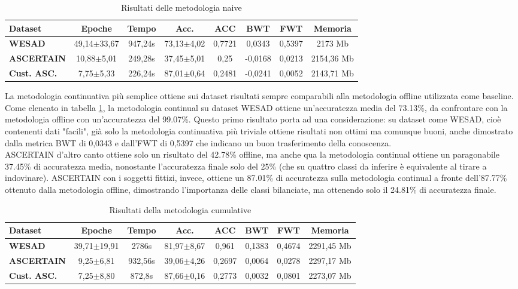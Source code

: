 \begin{table}[h]
\footnotesize
    \begin{tabular}{l|c|c|c|c|c|c|c}
        \textbf{Dataset} & \textbf{Epoche} & \textbf{Tempo} & \textbf{Acc.} & \textbf{ACC} & \textbf{BWT} & \textbf{FWT} & \textbf{Memoria}\\
        \hline
        \textbf{WESAD} & 49,14$\pm$33,67 & 947,24s & 73,13$\pm$4,02 & 0,7721 & 0,0343 & 0,5397 & 2173 Mb\\
        \textbf{ASCERTAIN} & 10,88$\pm$5,01 & 249,28s & 37,45$\pm$5,01 & 0,25 & -0,0168 & 0,0213 & 2154,36 Mb\\
        \textbf{Cust. ASC.} & 7,75$\pm$5,33 & 226,24s & 87,01$\pm$0,64 & 0,2481 & -0,0241 & 0,0052 & 2143,71 Mb\\
    \end{tabular}
    \caption{Risultati delle metodologia naive}
    \label{tab:rescontinual}
\end{table}

La metodologia continuativa più semplice ottiene sui dataset risultati sempre comparabili alla metodologia offline utilizzata come baseline. Come elencato in tabella \ref{tab:rescontinual}, la metodologia continual su dataset WESAD ottiene un'accuratezza media del 73.13\%, da confrontare con la metodologia offline con un'accuratezza del 99.07\%. Questo primo risultato porta ad una considerazione: su dataset come WESAD, cioè contenenti dati "facili", già solo la metodologia continuativa più triviale ottiene risultati non ottimi ma comunque buoni, anche dimostrato dalla metrica BWT di 0,0343 e dall'FWT di 0,5397 che indicano un buon trasferimento della conoscenza.\\
ASCERTAIN d'altro canto ottiene solo un risultato del 42.78\% offline, ma anche qua la metodologia continual ottiene un paragonabile 37.45\% di accuratezza media, nonostante l'accuratezza finale solo del 25\% (che su quattro classi da inferire è equivalente al tirare a indovinare). ASCERTAIN con i soggetti fittizi, invece, ottiene un 87.01\% di accuratezza sulla metodologia continual a fronte dell'87.77\% ottenuto dalla metodologia offline, dimostrando l'importanza delle classi bilanciate, ma ottenendo solo il 24.81\% di accuratezza finale.

\begin{table}[h]
\footnotesize
    \begin{tabular}{l|c|c|c|c|c|c|c}
        \textbf{Dataset} & \textbf{Epoche} & \textbf{Tempo} & \textbf{Acc.} & \textbf{ACC} & \textbf{BWT} & \textbf{FWT} & \textbf{Memoria}\\
        \hline
        \textbf{WESAD} & 39,71$\pm$19,91 & 2786s & 81,97$\pm$8,67 & 0,961 & 0,1383 & 0,4674 & 2291,45 Mb\\
        \textbf{ASCERTAIN} & 9,25$\pm$6,81 & 932,56s & 39,06$\pm$4,26 & 0,2697 & 0,0064 & 0,0278 & 2297,17 Mb\\
        \textbf{Cust. ASC.} & 7,25$\pm$8,80 & 872,8s & 87,66$\pm$0,16 & 0,2773 & 0,0032 & 0,0801 & 2273,07 Mb\\
    \end{tabular}
    \caption{Risultati della metodologia cumulative}
    \label{tab:rescumulative}
\end{table}

